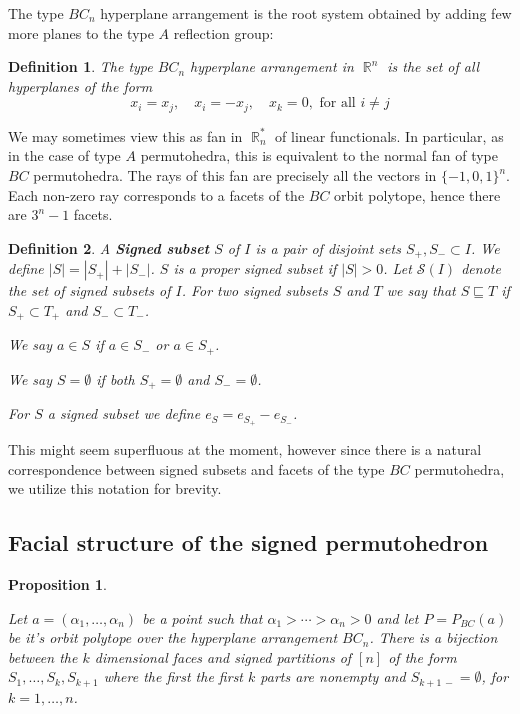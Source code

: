 \documentclass[12pt]{amsart}
\newtheorem{definition}{Definition}
\newtheorem{propo}[lemma]{Proposition}
\numberwithin{equation}{section}
\newcommand{\RR}{\operatorname{\mathbb{R}}}
\newcommand{\si}{\mathcal{S}}
\begin{document}
The type $BC_n$ hyperplane arrangement is the root system obtained by adding few more planes to the type $A$ reflection group:
\begin{definition}
The type $BC_n$ hyperplane arrangement in $\RR^n$ is the set of all hyperplanes of the form 
$$ x_i=x_j , \quad x_i=-x_j, \quad x_k = 0, \text{ for all  } i\neq j$$
\end{definition}
We may sometimes view this as fan in $\RR_n^*$ of linear functionals.  In particular, as in the case of type $A$ permutohedra, 
this is equivalent to the normal fan of type $BC$ permutohedra.   The rays of this fan are precisely all the vectors in $\{-1, 0, 1\}^n $. 
Each non-zero ray corresponds to a facets of the $BC$ orbit polytope, hence there are $3^n-1$ facets. 

 
 
 \begin{definition}
 A {\bf Signed subset} $S$ of $I$ is a pair of disjoint sets $S_+, S_-\subset I$.   We define $|S| = |S_+| + |S_-|$.  $S$ is a proper signed subset
 if $|S|>0$.   Let $\si(I)$ denote the set of signed subsets of $I$.   For two signed subsets $S$ and $T$ we say that $S\sqsubseteq  T$ 
 if $S_+\subset T_+$ and $S_-\subset T_-$.   
 
 We say $a\in S$ if $a\in S_-$ or $a\in S_+$.
 
 We say $S=\emptyset$ if both $S_+=\emptyset$ and $S_-=\emptyset$.
 
  For $S$ a signed subset we define $e_S = e_{S_+} - e_{S_-}$.
 \end{definition}
 
 This might seem superfluous at the moment, however since there is a natural correspondence between signed subsets and facets
 of the type $BC$ permutohedra, we utilize this notation for brevity. 
 
 


\subsection{Facial structure of the signed permutohedron}

\begin{propo}
\label{prop:spermfaces}

Let $a=(\alpha_1,\dots, \alpha_n)$ be a point such that $\alpha_1>\cdots > \alpha_n > 0$ and let $P=P_{BC}(a)$ be it's orbit polytope over the hyperplane arrangement $BC_n$. There is a bijection between the $k$ dimensional faces and signed partitions of $[n]$ of the form $S_1,\dots,S_k,S_{k+1}$ where the first the first $k$ parts are nonempty and $S_{k+1\, -}=\emptyset$, for $k=1,\dots, n$.

\end{propo}
\end{document}
